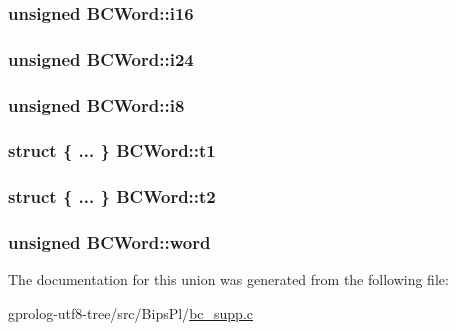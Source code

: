 \subsubsection[{\texorpdfstring{i16}{i16}}]{\setlength{\rightskip}{0pt plus 5cm}unsigned B\+C\+Word\+::i16}\hypertarget{unionBCWord_a8c3329540a5e15a320ee046bcc68f3b4}{}\label{unionBCWord_a8c3329540a5e15a320ee046bcc68f3b4}
\subsubsection[{\texorpdfstring{i24}{i24}}]{\setlength{\rightskip}{0pt plus 5cm}unsigned B\+C\+Word\+::i24}\hypertarget{unionBCWord_a1b4781c273f33c444975a5c427370504}{}\label{unionBCWord_a1b4781c273f33c444975a5c427370504}
\subsubsection[{\texorpdfstring{i8}{i8}}]{\setlength{\rightskip}{0pt plus 5cm}unsigned B\+C\+Word\+::i8}\hypertarget{unionBCWord_ab9456d8bd041583a32520027206f37ca}{}\label{unionBCWord_ab9456d8bd041583a32520027206f37ca}
\subsubsection[{\texorpdfstring{t1}{t1}}]{\setlength{\rightskip}{0pt plus 5cm}struct \{ ... \} 
   B\+C\+Word\+::t1}\hypertarget{unionBCWord_a70e755edbb220fd93df2c19803233c99}{}\label{unionBCWord_a70e755edbb220fd93df2c19803233c99}
\subsubsection[{\texorpdfstring{t2}{t2}}]{\setlength{\rightskip}{0pt plus 5cm}struct \{ ... \} 
   B\+C\+Word\+::t2}\hypertarget{unionBCWord_abbf0ee87987d69cb8a46e49454401f7c}{}\label{unionBCWord_abbf0ee87987d69cb8a46e49454401f7c}
\subsubsection[{\texorpdfstring{word}{word}}]{\setlength{\rightskip}{0pt plus 5cm}unsigned B\+C\+Word\+::word}\hypertarget{unionBCWord_ae6b64a6557710fc6e57ebbd02d1a3bc1}{}\label{unionBCWord_ae6b64a6557710fc6e57ebbd02d1a3bc1}


The documentation for this union was generated from the following file\+:\begin{DoxyCompactItemize}
\item 
gprolog-\/utf8-\/tree/src/\+Bips\+Pl/\hyperlink{bc__supp_8c}{bc\+\_\+supp.\+c}\end{DoxyCompactItemize}

